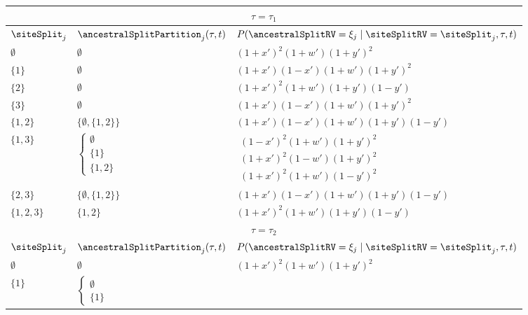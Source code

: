 \begin{table}
\centering
\begin{tabular}{|l|ll|}
    \multicolumn{3}{c}{$\tau=\tau_1$}\\
    \hline
    $\siteSplit_j$    & $\ancestralSplitPartition_j(\tau, t)$ & $P(\ancestralSplitRV=\xi_j \mid \siteSplitRV=\siteSplit_j,\tau,t)$\\
    \hline
    $\emptyset$&
    $\emptyset$&
    $(1+x')^2   (1+w')(1+y')^2$\\
     $\{1\}$    &
    $\emptyset$&
    $(1+x')(1-x')(1+w')(1+y')^2$\\
     $\{2\}$    &
    $\emptyset$&
    $(1+x')^2   (1+w')(1+y')(1-y')$\\
     $\{3\}$    &
    $\emptyset$&
    $(1+x')(1-x')(1+w')(1+y')^2$\\
    $\{1,2\}$  &
    $\{\emptyset,\{1,2\}\}$&
    $(1+x')(1-x')(1+w')(1+y')(1-y')$\\
    $\{1,3\}$  &
    $\left\{\begin{array}{l}
                    \emptyset\\
                    \{1\}\\
                    \{1,2\}
                \end{array}\right.$&
    $\begin{array}{l}
                    (1-x')^2   (1+w')(1+y')^2\\
                    (1+x')^2   (1-w')(1+y')^2\\
                    (1+x')^2   (1+w')(1-y')^2
                \end{array}$\\
    $\{2,3\}$  &
                $\{\emptyset,\{1,2\}\}$&
                $(1+x')(1-x')(1+w')(1+y')(1-y')$\\
    $\{1,2,3\}$&
                $\{1,2\}$&
                $(1+x')^2   (1+w')(1+y')(1-y')$\\
    \hline
    \multicolumn{3}{c}{$\tau=\tau_2$}\\
    \hline
    $\siteSplit_j$    & $\ancestralSplitPartition_j(\tau, t)$ & $P(\ancestralSplitRV=\xi_j \mid \siteSplitRV=\siteSplit_j,\tau,t)$\\
    \hline
    $\emptyset$       &$\emptyset$&$(1+x')^2   (1+w')(1+y')^2$\\
    $\{1\}$          &
    $\left\{\begin{array}{l}
                    \emptyset\\
                    \{1\}
                \end{array}\right.$&

\end{tabular}
\end{table}
